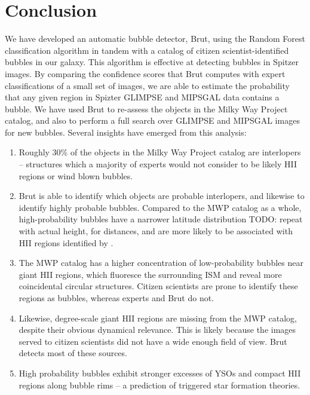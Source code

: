 \documentclass[preprint]{aastex}
\newcommand{\todo}[1]{{\color[rgb]{0, .5, .5} TODO: #1}}
\begin{document}
\section{Conclusion}
\label{sec:conclusion}
We have developed an automatic bubble detector, Brut, using the Random Forest classification algorithm in tandem with a catalog of citizen scientist-identified bubbles in our galaxy. This algorithm is effective at detecting bubbles in Spitzer images. By comparing the confidence scores that Brut computes with expert classifications of a small set of images, we are able to estimate the probability that any given region in Spizter GLIMPSE and MIPSGAL data contains a bubble. We have used Brut to re-assess the objects in the Milky Way Project catalog, and also to perform a full search over GLIMPSE and MIPSGAL images for new bubbles.  Several insights have emerged from this analysis:
\begin{enumerate}
\item Roughly 30\% of the objects in the Milky Way Project catalog are interlopers -- structures which a majority of experts would not consider to be likely HII regions or wind blown bubbles.
\item Brut is able to identify which objects are probable interlopers, and likewise to identify highly probable bubbles. Compared to the MWP catalog as a whole, high-probability bubbles have a narrower latitude distribution \todo{repeat with actual height, for distances}, and are more likely to be associated with HII regions identified by \cite{Anderson11}.
\item The MWP catalog has a higher concentration of low-probability bubbles near giant HII regions, which fluoresce the surrounding ISM and reveal more coincidental circular structures. Citizen scientists are prone to identify these regions as bubbles, whereas experts and Brut do not.
\item Likewise, degree-scale giant HII regions are missing from the MWP catalog, despite their obvious dynamical relevance. This is likely because the images served to citizen scientists did not have a wide enough field of view. Brut detects most of these sources.
\item High probability bubbles  exhibit stronger excesses of YSOs and compact HII regions along bubble rims -- a prediction of triggered star formation theories.
\end{enumerate}
\end{document}

